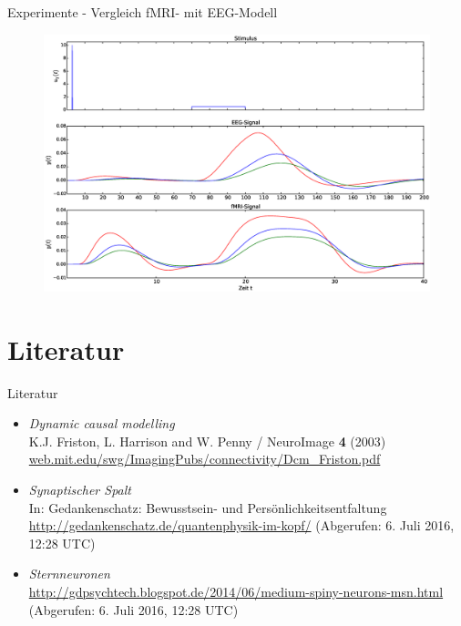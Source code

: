 \documentclass{beamer}
\begin{document}
\begin{frame}{Experimente - Vergleich fMRI- mit EEG-Modell}
\begin{figure}
\centering
\includegraphics[scale=0.25]{res/hemo-EEG-vergleich3.eps}
\end{figure}
\end{frame}

\section{Literatur}
	\begin{frame}{Literatur}
		\begin{itemize}
			\item \textit{Dynamic causal modelling} \\ {\small K.J. Friston, L. Harrison and W. Penny / NeuroImage \textbf{4} (2003)} \\ {\footnotesize \url{web.mit.edu/swg/ImagingPubs/connectivity/Dcm_Friston.pdf}}
			\item \textit{Synaptischer Spalt}\\  {\small In: Gedankenschatz: Bewusstsein- und Persönlichkeitsentfaltung}\\{\footnotesize \url{http://gedankenschatz.de/quantenphysik-im-kopf/}}  {\tiny(Abgerufen: 6. Juli 2016, 12:28 UTC)}
			\item \textit{Sternneuronen}\\{\footnotesize \url{http://gdpsychtech.blogspot.de/2014/06/medium-spiny-neurons-msn.html}}  {\tiny(Abgerufen: 6. Juli 2016, 12:28 UTC)}	
						
		\end{itemize}
	\end{frame}
	
\end{document}
